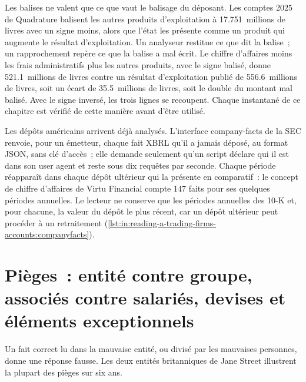 \label{lst:in:reading-a-trading-firms-accounts:number}

Les balises ne valent que ce que vaut le balisage du déposant. Les comptes 2025 de Quadrature balisent les autres produits d'exploitation
à 17.751~millions de livres avec un signe moins, alors que l'état les présente comme un produit qui augmente le résultat d'exploitation. Un analyseur restitue
ce que dit la balise~; un rapprochement repère ce que la balise a mal écrit. Le chiffre d'affaires moins les frais administratifs plus les autres produits, avec le signe balisé,
donne 521.1~millions de livres contre un résultat d'exploitation publié de 556.6~millions de livres, soit un écart de
35.5~millions de livres, soit le double du montant mal balisé. Avec le signe inversé, les trois lignes se recoupent. Chaque instantané
de ce chapitre est vérifié de cette manière avant d'être utilisé.

Les dépôts américains arrivent déjà analysés. L'interface company-facts de la SEC renvoie, pour un émetteur, chaque fait XBRL qu'il a
jamais déposé, au format JSON, sans clé d'accès~; elle demande seulement qu'un script déclare qui il est dans son user agent et reste
sous dix requêtes par seconde. Chaque période réapparaît dans chaque dépôt ultérieur qui la présente en comparatif~: le concept de
chiffre d'affaires de Virtu Financial compte 147 faits pour ses quelques périodes annuelles. Le lecteur ne conserve que les périodes
annuelles des 10-K et, pour chacune, la valeur du dépôt le plus récent, car un dépôt ultérieur peut procéder à un retraitement
(\cref{lst:in:reading-a-trading-firms-accounts:companyfacts}).

\label{lst:in:reading-a-trading-firms-accounts:companyfacts}

\section{Pièges~: entité contre groupe, associés contre salariés, devises et éléments exceptionnels}

Un fait correct lu dans la mauvaise entité, ou divisé par les mauvaises personnes, donne une réponse fausse. Les deux entités britanniques
de Jane Street illustrent la plupart des pièges sur six ans.

